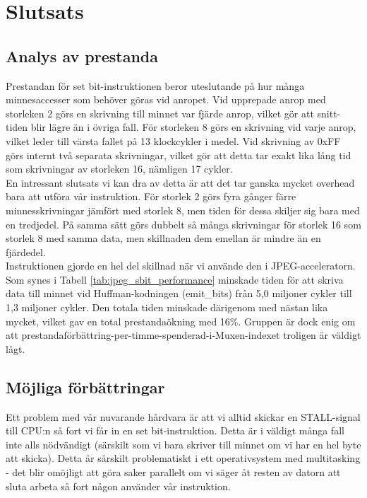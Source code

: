 \documentclass[a4paper]{article}
\begin{document}
\section{Slutsats}

\subsection{Analys av prestanda}
Prestandan för set bit-instruktionen beror uteslutande på hur många minnesaccesser som behöver göras
vid anropet. Vid upprepade anrop med storleken 2 görs en skrivning till minnet var fjärde anrop, vilket gör att
snitt-tiden blir lägre än i övriga fall. För storleken 8 görs en skrivning vid varje anrop, vilket
leder till värsta fallet på 13 klockcykler i medel. Vid skrivning av 0xFF görs internt två separata skrivningar,
vilket gör att detta tar exakt lika lång tid som skrivningar av storleken 16, nämligen 17 cykler.\\

En intressant slutsats vi kan dra av detta är att det tar ganska mycket overhead bara att utföra vår
instruktion. För storlek 2 görs fyra gånger färre minnesskrivningar jämfört med storlek 8, men tiden
för dessa skiljer sig bara med en tredjedel. På samma sätt görs dubbelt så många skrivningar för
storlek 16 som storlek 8 med samma data, men skillnaden dem emellan är mindre än en fjärdedel.\\

Instruktionen gjorde en hel del skillnad när vi använde den i JPEG-acceleratorn. Som synes i Tabell
\ref{tab:jpeg_sbit_performance} minskade tiden för att skriva data till minnet vid Huffman-kodningen
(emit\_bits) från 5,0 miljoner cykler till 1,3 miljoner cykler. Den totala tiden minskade
därigenom med nästan lika mycket, vilket gav en total prestandaökning med 16\%. Gruppen är dock
enig om att prestandaförbättring-per-timme-spenderad-i-Muxen-indexet troligen är väldigt lågt.\\


\subsection{Möjliga förbättringar}
Ett problem med vår nuvarande hårdvara är att vi alltid skickar en STALL-signal till CPU:n så fort vi
får in en set bit-instruktion. Detta är i väldigt många fall inte alls nödvändigt (särskilt som vi
bara skriver till minnet om vi har en hel byte att skicka). Detta är särskilt problematiskt i ett
operativsystem med multitasking - det blir omöjligt att göra saker parallelt om vi säger åt resten
av datorn att sluta arbeta så fort någon använder vår instruktion.\\
\end{document}
